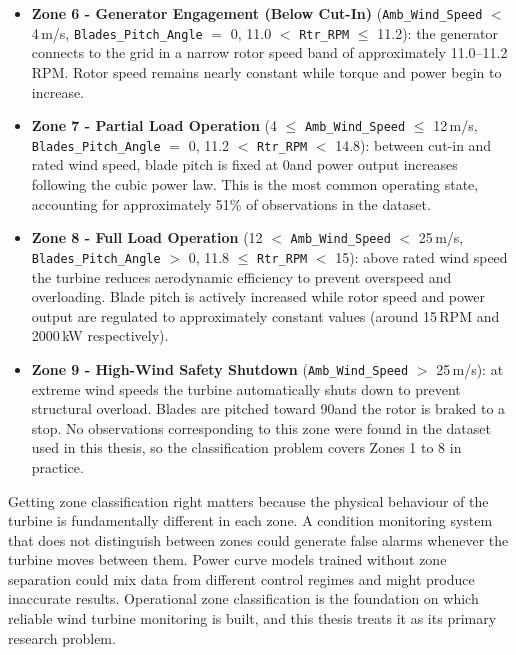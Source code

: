 \begin{itemize}
  \item \textbf{Zone 6 - Generator Engagement (Below Cut-In)}
        (\texttt{Amb\_Wind\_Speed} $<$ 4\,m/s,
         \texttt{Blades\_Pitch\_Angle} $=$ 0\textdegree,
         11.0 $<$ \texttt{Rtr\_RPM} $\leq$ 11.2):
        the generator connects to the grid in a narrow rotor speed band of approximately
        11.0--11.2\,RPM. Rotor speed remains nearly constant while torque and power
        begin to increase.

  \item \textbf{Zone 7 - Partial Load Operation}
        (4 $\leq$ \texttt{Amb\_Wind\_Speed} $\leq$ 12\,m/s,
         \texttt{Blades\_Pitch\_Angle} $=$ 0\textdegree,
         11.2 $<$ \texttt{Rtr\_RPM} $<$ 14.8):
        between cut-in and rated wind speed, blade pitch is fixed at 0\textdegree and
        power output increases following the cubic power law. This is the most common
        operating state, accounting for approximately 51\% of observations in the dataset.

  \item \textbf{Zone 8 - Full Load Operation}
        (12 $<$ \texttt{Amb\_Wind\_Speed} $<$ 25\,m/s,
         \texttt{Blades\_Pitch\_Angle} $>$ 0\textdegree,
         11.8 $\leq$ \texttt{Rtr\_RPM} $<$ 15):
        above rated wind speed the turbine reduces aerodynamic efficiency to prevent
        overspeed and overloading. Blade pitch is actively increased while rotor speed
        and power output are regulated to approximately constant values
        (around 15\,RPM and 2000\,kW respectively).

  \item \textbf{Zone 9 - High-Wind Safety Shutdown}
        (\texttt{Amb\_Wind\_Speed} $>$ 25\,m/s):
        at extreme wind speeds the turbine automatically shuts down to prevent structural
        overload. Blades are pitched toward 90\textdegree and the rotor is braked to a
        stop. No observations corresponding to this zone were found in the dataset used
        in this thesis, so the classification problem covers Zones 1 to 8 in practice.
\end{itemize}

Getting zone classification right matters because the physical behaviour of the turbine
is fundamentally different in each zone. A condition monitoring system that does not
distinguish between zones could generate false alarms whenever the turbine moves between
them. Power curve models trained without zone separation could mix data from different
control regimes and might produce inaccurate results. Operational zone classification is
the foundation on which reliable wind turbine monitoring is built, and this thesis treats
it as its primary research problem.

